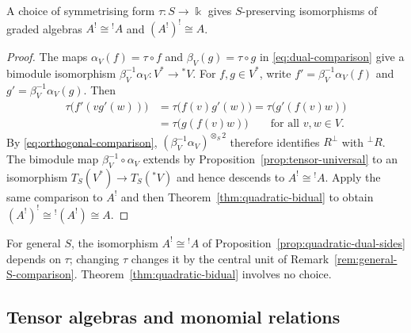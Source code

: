 \begin{advanced}
\begin{proposition}\label{prop:quadratic-dual-sides}
A choice of symmetrising form $\tau:S\to\Bbbk$ gives $S$-preserving isomorphisms of graded algebras $A^!\cong{}^!A$ and $(A^!)^!\cong A$.
\end{proposition}

\begin{proof}
The maps $\alpha_V(f)=\tau\circ f$ and $\beta_V(g)=\tau\circ g$ in \eqref{eq:dual-comparison} give a bimodule isomorphism $\beta_V^{-1}\alpha_V:V^*\to{}^*V$.
For $f,g\in V^*$, write $f'=\beta_V^{-1}\alpha_V(f)$ and $g'=\beta_V^{-1}\alpha_V(g)$. Then
\[
\begin{aligned}
\tau\bigl(f'(vg'(w))\bigr)
&=\tau\bigl(f(v)g'(w)\bigr)
=\tau\bigl(g'(f(v)w)\bigr)\\
&=\tau\bigl(g(f(v)w)\bigr)
\qquad\text{for all }v,w\in V.
\end{aligned}
\]
By \eqref{eq:orthogonal-comparison}, $(\beta_V^{-1}\alpha_V)^{\otimes_S2}$ therefore identifies $R^\perp$ with ${}^\perp R$.
The bimodule map $\beta_V^{-1}\circ\alpha_V$ extends by Proposition~\ref{prop:tensor-universal} to an isomorphism $T_S(V^*)\to T_S({}^*V)$ and hence descends to $A^!\cong{}^!A$.
Apply the same comparison to $A^!$ and then Theorem~\ref{thm:quadratic-bidual} to obtain $(A^!)^!\cong{}^!(A^!)\cong A$.
\end{proof}

For general $S$, the isomorphism $A^!\cong{}^!A$ of Proposition~\ref{prop:quadratic-dual-sides} depends on $\tau$; changing $\tau$ changes it by the central unit of Remark~\ref{rem:general-S-comparison}.
Theorem~\ref{thm:quadratic-bidual} involves no choice.
\end{advanced}

\iffalse 


\subsection{Tensor algebras and monomial relations}

